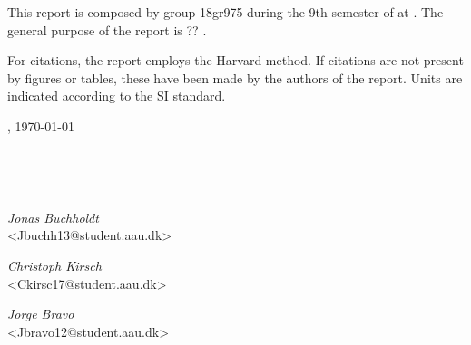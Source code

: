 This report is composed by group 18gr975 during the 9th semester of \projectFaculty{} at \AAU{}. The general purpose of the report is ?? \textit{\projectTheme}. 

For citations, the report employs the Harvard method. If citations are not present by figures or tables, these have been made by the authors of the report. Units are indicated according to the SI standard.


\vspace{\baselineskip}\hfill \AAU, \today
\vfill\noindent
\begin{center}
\begin{minipage}[b]{0.45\textwidth}
 \centering
  \textit{}\\
 {}
\end{minipage}
\hspace{0.3cm}
\begin{minipage}[b]{0.45\textwidth}
 \centering
  \textit{}\\
 {}
\end{minipage}
\end{center}
\vspace{1\baselineskip}
\begin{center}
\begin{minipage}[b]{0.45\textwidth}
 \centering
  \textit{Jonas Buchholdt}\\
 {\footnotesize <Jbuchh13@student.aau.dk>}
\end{minipage}
\hspace{0.3cm}
\begin{minipage}[b]{0.45\textwidth}
 \centering
  \textit{Christoph Kirsch}\\
 {\footnotesize <Ckirsc17@student.aau.dk>}
\end{minipage}
\vfill\noindent
\begin{minipage}[b]{0.45\textwidth}
 \centering
  \textit{Jorge Bravo}\\
 {\footnotesize <Jbravo12@student.aau.dk>}
\end{minipage}
\end{center}

